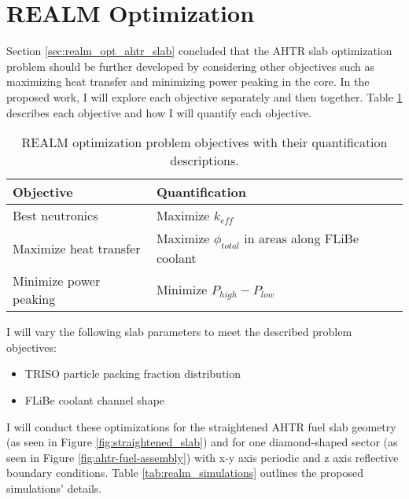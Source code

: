 \section{REALM Optimization}
Section \ref{sec:realm_opt_ahtr_slab} concluded that the \gls{AHTR} slab 
optimization problem should be further developed by considering other objectives 
such as maximizing heat transfer and minimizing power peaking in the core. 
In the proposed work, I will explore each objective separately and then together.
Table \ref{tab:objectives} describes each objective and how I will quantify 
each objective. 
\begin{table}[!htbp]
    \centering
    \onehalfspacing
    \caption{\acrfull{REALM} optimization problem objectives with their quantification 
    descriptions.}
	\label{tab:objectives}
    \footnotesize
    \begin{tabular}{p{4cm}p{8cm}}
    \hline 
    \textbf{Objective}& \textbf{Quantification}  \\
    \hline
    Best neutronics & Maximize $k_{eff}$\\ 
    Maximize heat transfer & Maximize $\phi_{total}$ in areas along FLiBe coolant \\
    Minimize power peaking & Minimize $P_{high}-P_{low}$ \\
    \hline
    \end{tabular}
\end{table}
I will vary the following slab parameters to meet the described problem objectives: 
\begin{itemize}
    \item \gls{TRISO} particle packing fraction distribution
    \item \gls{FLiBe} coolant channel shape 
\end{itemize} 
I will conduct these optimizations for the straightened \gls{AHTR} fuel slab 
geometry (as seen in Figure \ref{fig:straightened_slab}) and for one 
diamond-shaped sector (as seen in Figure \ref{fig:ahtr-fuel-assembly}) with 
x-y axis periodic and z axis reflective boundary conditions. 
Table \ref{tab:realm_simulations} outlines the proposed simulations' details. 
